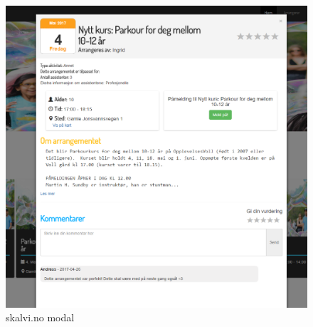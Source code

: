 \begin{figure}[H]
\begin{minipage}{.7\textwidth}
\includegraphics[scale=0.2]{fig/PaperPrototype/modal_skalvi.PNG}
\caption{skalvi.no modal}
\label{fig:skalvi_modal}
\end{minipage}
\end{figure}






